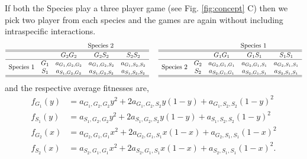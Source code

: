 \documentclass[12pt]{article}
\begin{document}
If both the Species play a three player game (see Fig. \ref{fig:concept} C) then we pick two player from each species and the games are again without including intraspecific interactions.
\begin{equation}\label{}
\begin{array}{ccccc}
& & \multicolumn{3}{c}{\text{Species 2}}\\
\hline\hline
& & G_2 G_2	&	G_2 S_2		&	S_2 S_2\\
\hline
 \multirow{2}{*}{Species 1} & G_1 	& a_{G_1,G_2,G_2} &	a_{G_1,G_2,S_2} &	a_{G_1,S_2,S_2} 
 \\
 & S_1 	&  a_{S_1,G_2,G_2} &a_{S_1,G_2,S_2}  &a_{S_1,S_2,S_2} \\
 \hline\hline
\end{array}
\hspace{0.5cm}
\begin{array}{ccccc}
& & \multicolumn{3}{c}{\text{Species 1}}\\
\hline\hline
& & G_1 G_1	&	G_1 S_1		&	S_1 S_1\\
\hline
 \multirow{2}{*}{Species 2} & G_2	& a_{G_2,G_1,G_1} &	a_{G_2,G_1,S_1} &	a_{G_2,S_1,S_1} 
 \\
 & S_2 	&  a_{S_2,G_1,G_1} &a_{S_2,G_1,S_1}  &a_{S_2,S_1,S_1} \nonumber \\
 \hline\hline
\end{array}
\end{equation}
and the respective average fitnesses are,
\begin{eqnarray}
f_{G_1} (y) &= a_{G_1,G_2,G_2} y^2 + 2 a_{G_1,G_2,S_2} y (1-y) + a_{G_1,S_2,S_2} (1-y)^2  \nonumber \\
f_{S_1} (y) &= a_{S_1,G_2,G_2} y^2 + 2 a_{S_1,G_2,S_2} y (1-y) + a_{S_1,S_2,S_2} (1-y)^2 \nonumber \\
f_{G_2} (x) &= a_{G_2,G_1,G_1} x^2 + 2 a_{G_2,G_1,S_1} x (1-x) + a_{G_2,S_1,S_1} (1-x)^2 \nonumber \\ 
f_{S_2} (x) &= a_{S_2,G_1,G_1} x^2 + 2 a_{S_2,G_1,S_1} x (1-x) + a_{S_2,S_1,S_1} (1-x)^2.\nonumber
\end{eqnarray}
\end{document}
